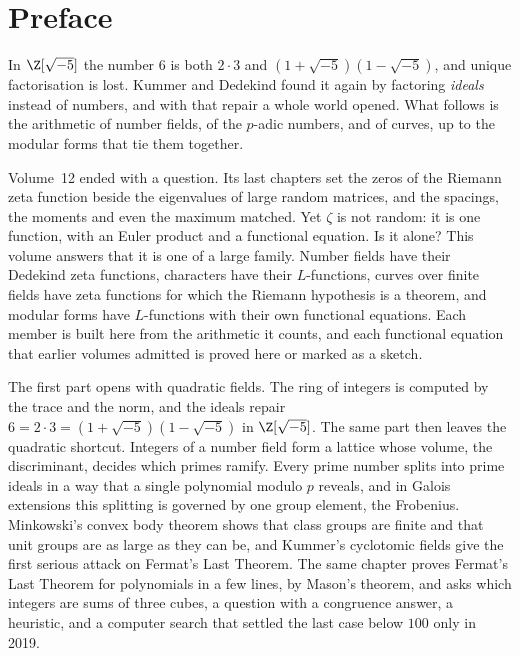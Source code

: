 \chapter*{Preface}
In $\Z[\sqrt{-5}]$ the number $6$ is both $2\cdot3$ and $(1+\sqrt{-5})(1-\sqrt{-5})$, and unique factorisation is lost.
Kummer and Dedekind found it again by factoring \emph{ideals} instead of numbers, and with that repair a whole world
opened. What follows is the arithmetic of number fields, of the $p$-adic numbers, and of
curves, up to the modular forms that tie them together.

Volume~12 ended with a question. Its last chapters set the zeros of the Riemann zeta function beside the eigenvalues of
large random matrices, and the spacings, the moments and even the maximum matched. Yet $\zeta$ is not random: it is one
function, with an Euler product and a functional equation. Is it alone? This volume answers that it is one of a large
family. Number fields have their Dedekind zeta functions, characters have their $L$-functions, curves over finite fields
have zeta functions for which the Riemann hypothesis is a theorem, and modular forms have $L$-functions with their own
functional equations. Each member is built here from the arithmetic it counts, and each functional equation that
earlier volumes admitted is proved here or marked as a sketch.

The first part opens with quadratic fields. The ring of integers is computed by the trace and the norm, and the ideals
repair $6=2\cdot3=(1+\sqrt{-5})(1-\sqrt{-5})$ in $\Z[\sqrt{-5}]$. The same part then leaves the quadratic shortcut.
Integers of a number field form a lattice whose volume, the discriminant, decides which primes
ramify. Every prime number splits into prime ideals in a way that a single polynomial modulo $p$ reveals, and in Galois
extensions this splitting is governed by one group element, the Frobenius. Minkowski's convex body theorem shows that
class groups are finite and that unit groups are as large as they can be, and Kummer's cyclotomic fields give the
first serious attack on Fermat's Last Theorem. The same chapter proves Fermat's Last Theorem for polynomials in a few lines,
by Mason's theorem, and asks which integers are sums of three cubes, a question with a congruence answer, a heuristic,
and a computer search that settled the last case below $100$ only in 2019.

